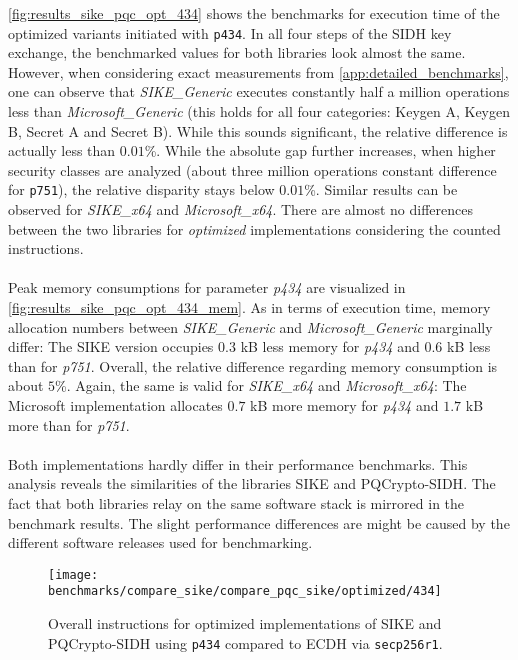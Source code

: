 \autoref{fig:results_sike_pqc_opt_434} shows the benchmarks for execution time of the optimized variants initiated with \texttt{p434}. In all four steps of the \gls{SIDH} key exchange, the benchmarked values for both libraries look almost the same. However, when considering exact measurements from  \ref{app:detailed_benchmarks}, one can observe that \textit{SIKE\_Generic} executes constantly half a million operations less than \textit{Microsoft\_Generic} (this holds for all four categories: Keygen A, Keygen B, Secret A and Secret B). While this sounds significant, the relative difference is actually less than $0.01$\%. While the absolute gap further increases, when higher security classes are analyzed (about three million operations constant difference for \texttt{p751}), the relative disparity stays below $0.01$\%. Similar results can be observed for \textit{SIKE\_x64} and \textit{Microsoft\_x64}. There are almost no differences between the two libraries for \textit{optimized} implementations considering the counted instructions.
\\\\
Peak memory consumptions for parameter \textit{p434} are visualized in  \autoref{fig:results_sike_pqc_opt_434_mem}. As in terms of execution time, memory allocation numbers between \textit{SIKE\_Generic} and \textit{Microsoft\_Generic} marginally differ: The \gls{SIKE} version occupies $0.3$ \gls{kB} less memory for \textit{p434} and $0.6$ \gls{kB} less than for \textit{p751}. Overall, the relative difference regarding memory consumption is about $5$\%. Again, the same is valid for \textit{SIKE\_x64} and \textit{Microsoft\_x64}: The Microsoft implementation allocates $0.7$ \gls{kB} more memory for \textit{p434} and $1.7$ \gls{kB} more than for \textit{p751}.
\\\\
Both implementations hardly differ in their performance benchmarks. This analysis reveals the similarities of the libraries \gls{SIKE} and \gls{PQCrypto-SIDH}. The fact that both libraries relay on the same software stack is mirrored in the benchmark results. The slight performance differences are might be caused by the different software releases used for benchmarking.

\begin{figure}[H]
  \centering
  \texttt{[image: benchmarks/compare\_sike/compare\_pqc\_sike/optimized/434]}
  \caption[Overall instructions for optimized implementations of \gls{SIKE} and \gls{PQCrypto-SIDH} using \texttt{p434}]
  {Overall instructions for optimized implementations of \gls{SIKE} and \gls{PQCrypto-SIDH} using \texttt{p434} compared to \gls{ECDH} via \texttt{secp256r1}.}
  \label{fig:results_sike_pqc_opt_434}
\end{figure}


